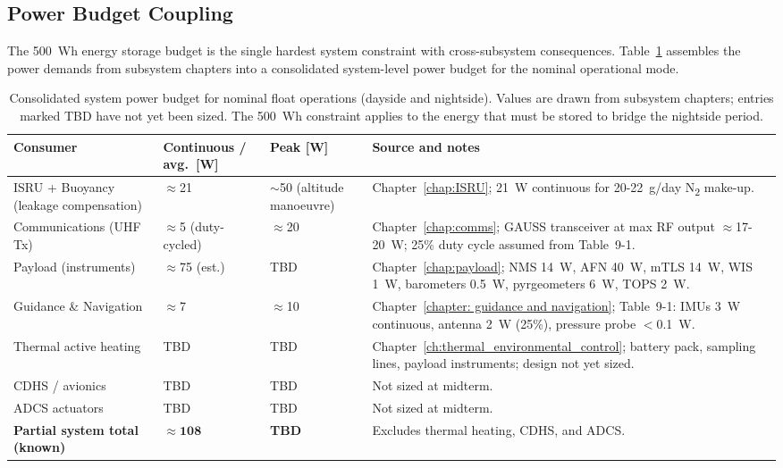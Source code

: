 \subsection{Power Budget Coupling}
\label{subsec:power_coupling}

The 500~Wh energy storage budget is the single hardest system constraint with cross-subsystem consequences. Table~\ref{tab:power_allocation} assembles the power demands from subsystem chapters into a consolidated system-level power budget for the nominal operational mode.

\begin{table}[h!]
\centering
\caption{Consolidated system power budget for nominal float operations (dayside and nightside). Values are drawn from subsystem chapters; entries marked TBD have not yet been sized. The 500~Wh constraint applies to the energy that must be stored to bridge the nightside period.}
\label{tab:power_allocation}
\renewcommand{\arraystretch}{1.25}
\begin{tabular}{p{3.8cm}p{2.0cm}p{2.0cm}p{5.2cm}}
\hline
\textbf{Consumer} & \textbf{Continuous / avg.\ [W]} & \textbf{Peak [W]} & \textbf{Source and notes} \\
\hline
ISRU + Buoyancy (leakage compensation) & $\approx$21 & $\sim$50 (altitude manoeuvre) & Chapter~\ref{chap:ISRU}; 21~W continuous for 20-22~g/day N\textsubscript{2} make-up. \\
Communications (UHF Tx) & $\approx$5 (duty-cycled) & $\approx$20 & Chapter~\ref{chap:comms}; GAUSS transceiver at max RF output $\approx$17-20~W; 25\% duty cycle assumed from Table~9-1. \\
Payload (instruments) & $\approx$75 (est.) & TBD & Chapter~\ref{chap:payload}; NMS 14~W, AFN 40~W, mTLS 14~W, WIS 1~W, barometers 0.5~W, pyrgeometers 6~W, TOPS 2~W. \\
Guidance \& Navigation & $\approx$7 & $\approx$10 & Chapter~\ref{chapter: guidance and navigation}; Table~9-1: IMUs 3~W continuous, antenna 2~W (25\%), pressure probe $<$0.1~W. \\
Thermal active heating & TBD & TBD & Chapter~\ref{ch:thermal_environmental_control}; battery pack, sampling lines, payload instruments; design not yet sized. \\
CDHS / avionics & TBD & TBD & Not sized at midterm. \\
ADCS actuators & TBD & TBD & Not sized at midterm. \\
\hline
\textbf{Partial system total (known)} & $\boldsymbol{\approx 108}$ & \textbf{TBD} & Excludes thermal heating, CDHS, and ADCS. \\
\hline
\end{tabular}
\end{table}

